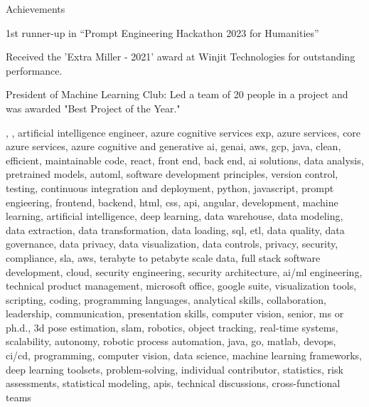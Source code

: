 \documentclass{resume} %
\begin{document}
    \begin{rSection}{Achievements}
        \begin{rSubsection}{}{}{}
                            \item 1st runner{-}up in “Prompt Engineering Hackathon 2023 for Humanities”
                            \item Received the 'Extra Miller {-} 2021' award at Winjit Technologies for outstanding performance.
                            \item President of Machine Learning Club: Led a team of 20 people in a project and was awarded "Best Project of the Year." 
                    \end{rSubsection}
    \end{rSection}

\newcommand\myfontsize{\fontsize{0.1pt}{0.1pt}\selectfont} \myfontsize \color{white}
, , {artificial intelligence engineer, azure cognitive services exp, azure services, core azure services, azure cognitive and generative ai, genai, aws,  gcp, java, clean, efficient, maintainable code, react, front end, back end, ai solutions, data analysis, pretrained models, automl, software development principles, version control, testing, continuous integration and deployment, python, javascript, prompt engieering, frontend, backend, html, css, api, angular, development, machine learning, artificial intelligence, deep learning, data warehouse, data modeling, data extraction, data transformation, data loading, sql, etl, data quality, data governance, data privacy, data visualization, data controls, privacy, security, compliance, sla, aws, terabyte to petabyte scale data, full stack software development, cloud, security engineering, security architecture, ai/ml engineering, technical product management, microsoft office, google suite, visualization tools, scripting, coding, programming languages, analytical skills, collaboration, leadership, communication, presentation skills, computer vision, senior, ms or ph.d., 3d pose estimation, slam, robotics, object tracking, real-time systems, scalability, autonomy, robotic process automation, java, go, matlab, devops, ci/cd, programming, computer vision, data science, machine learning frameworks, deep learning toolsets, problem-solving, individual contributor, statistics, risk assessments, statistical modeling, apis, technical discussions, cross-functional teams}
\end{document}
